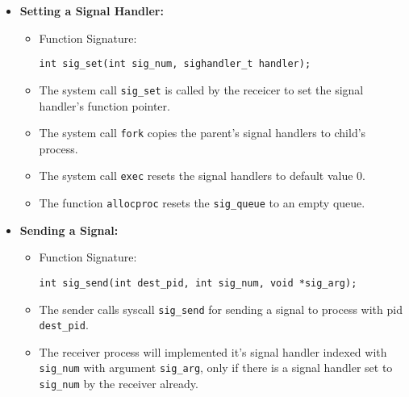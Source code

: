 \documentclass[a4 paper]{article}
\newcommand{\code}[1]{\texttt{#1}}
\begin{document}
\begin{itemize}
\item \textbf{Setting a Signal Handler:}
\begin{itemize}
  \item Function Signature: \begin{lstlisting}
int sig_set(int sig_num, sighandler_t handler);
  \end{lstlisting}
  \item The system call \code{sig\_set} is called by the receicer to set the signal handler's function pointer.
  \item The system call \code{fork} copies the parent's signal handlers to child's process.
  \item The system call \code{exec} resets the signal handlers to default value 0.
  \item The function \code{allocproc} resets the \code{sig\_queue} to an empty queue.
\end{itemize}

\item \textbf{Sending a Signal:}
\begin{itemize}
  \item Function Signature: \begin{lstlisting}
int sig_send(int dest_pid, int sig_num, void *sig_arg);
  \end{lstlisting}
  \item The sender calls syscall \code{sig\_send} for sending a signal to process with pid \code{dest\_pid}.
  \item The receiver process will implemented it's signal handler indexed with \code{sig\_num} with argument \code{sig\_arg}, only if there is a signal handler set to \code{sig\_num} by the receiver already.
\end{itemize}


\end{itemize}
\end{document}
